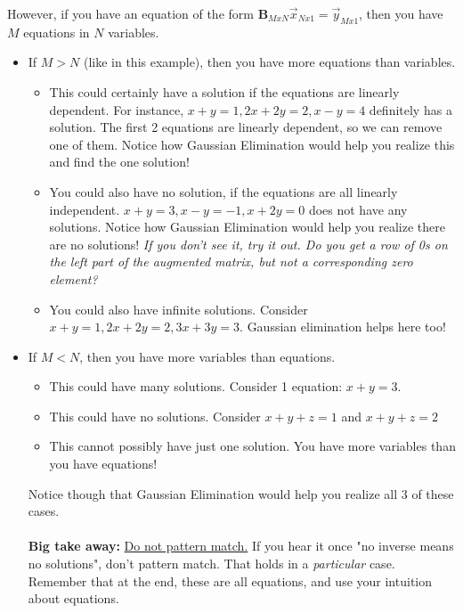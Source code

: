 \begin{enumerate}
{	However, if you have an equation of the form $\mathbf{B}_{MxN} \vec{x}_{Nx1} = \vec{y}_{Mx1}$, then you have $M$ equations in $N$ variables. 
	\begin{itemize} 
		\item If $M > N$ (like in this example), then you have more equations than variables. 
		\begin{itemize} 
			\item This could certainly have a solution if the equations are linearly dependent. For instance, $x+y=1, 2x+2y=2, x-y=4$ definitely has a solution. The first 2 equations are linearly dependent, so we can remove one of them. Notice how Gaussian Elimination would help you realize this and find the one solution!
			\item You could also have no solution, if the equations are all linearly independent. $x+y=3, x-y=-1, x+2y=0$ does not have any solutions. Notice how Gaussian Elimination would help you realize there are no solutions! \textit{If you don't see it, try it out. Do you get a row of 0s on the left part of the augmented matrix, but not a corresponding zero element?}
			\item You could also have infinite solutions. Consider $x+y=1, 2x+2y=2, 3x+3y=3$. Gaussian elimination helps here too!
		\end{itemize} 
		\item If $M < N$, then you have more variables than equations. 
		\begin{itemize}
			\item This could have many solutions. Consider 1 equation: $x+y=3$. 
			\item This could have no solutions. Consider $x+y+z=1$ and $x+y+z=2$
			\item This cannot possibly have just one solution. You have more variables than you have equations!
		\end{itemize}
		Notice though that Gaussian Elimination would help you realize all 3 of these cases. \\ \\

		\textbf{Big take away:} \underline{Do not pattern match.} If you hear it once "no inverse means no solutions", don't pattern match. That holds in a \textit{particular} case. Remember that at the end, these are all equations, and use your intuition about equations. 
	\end{itemize}
}


\end{enumerate}
